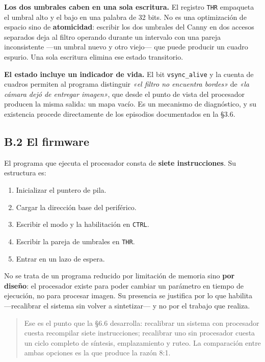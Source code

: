 \textbf{Los dos umbrales caben en una sola escritura.} El registro
\texttt{THR} empaqueta el umbral alto y el bajo en una palabra de 32
bits. No es una optimización de espacio sino de \textbf{atomicidad}:
escribir los dos umbrales del Canny en dos accesos separados deja al
filtro operando durante un intervalo con una pareja inconsistente ---un
umbral nuevo y otro viejo--- que puede producir un cuadro espurio. Una
sola escritura elimina ese estado transitorio.

\textbf{El estado incluye un indicador de vida.} El bit
\texttt{vsync\_alive} y la cuenta de cuadros permiten al programa
distinguir \emph{«el filtro no encuentra bordes»} de \emph{«la cámara
dejó de entregar imagen»}, que desde el punto de vista del procesador
producen la misma salida: un mapa vacío. Es un mecanismo de diagnóstico,
y su existencia procede directamente de los episodios documentados en la
§3.6.

\subsection{B.2 El firmware}\label{b.2-el-firmware}

El programa que ejecuta el procesador consta de \textbf{siete
instrucciones}. Su estructura es:

\begin{enumerate}
\def\labelenumi{\arabic{enumi}.}
\tightlist
\item
  Inicializar el puntero de pila.
\item
  Cargar la dirección base del periférico.
\item
  Escribir el modo y la habilitación en \texttt{CTRL}.
\item
  Escribir la pareja de umbrales en \texttt{THR}.
\item
  Entrar en un lazo de espera.
\end{enumerate}

No se trata de un programa reducido por limitación de memoria sino
\textbf{por diseño}: el procesador existe para poder cambiar un
parámetro en tiempo de ejecución, no para procesar imagen. Su presencia
se justifica por lo que habilita ---recalibrar el sistema sin volver a
sintetizar--- y no por el trabajo que realiza.

\begin{quote}
Ese es el punto que la §6.6 desarrolla: recalibrar un sistema con
procesador cuesta recompilar siete instrucciones; recalibrar uno sin
procesador cuesta un ciclo completo de síntesis, emplazamiento y ruteo.
La comparación entre ambas opciones es la que produce la razón 8:1.
\end{quote}

